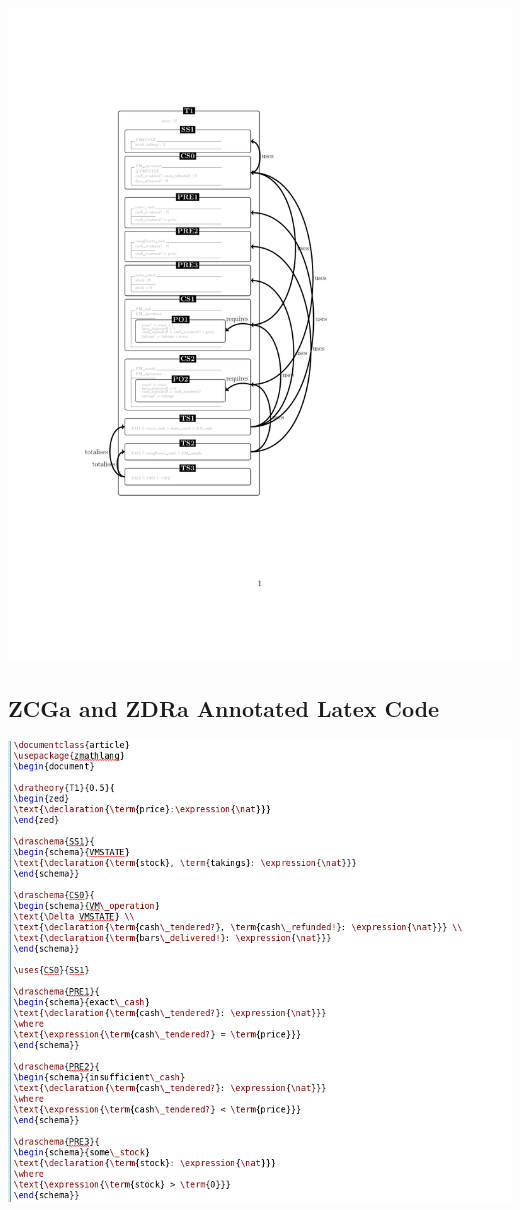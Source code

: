 \includegraphics[clip, trim=3cm 7cm 6cm 4.2cm]{examples/vm/2comp.pdf}

%
\subsection{ZCGa and ZDRa Annotated Latex Code}
\label{app:vm1n2}
\includegraphics[scale=0.5]{examples/vm/1n2imagea.png}

